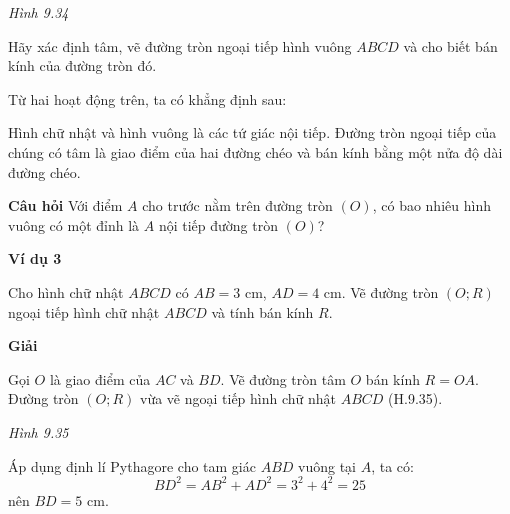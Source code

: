 \begin{lesson}
\begin{center}
        \textit{Hình 9.34}
    \end{center}

    Hãy xác định tâm, vẽ đường tròn ngoại tiếp hình vuông $ABCD$ và cho biết bán kính của đường tròn đó.

    \answerline
    \answerline

    Từ hai hoạt động trên, ta có khẳng định sau:

    \begin{keyconcept}
        Hình chữ nhật và hình vuông là các tứ giác nội tiếp. Đường tròn ngoại tiếp của chúng có tâm là giao điểm của hai đường chéo và bán kính bằng một nửa độ dài đường chéo.
    \end{keyconcept}

    \textbf{Câu hỏi} Với điểm $A$ cho trước nằm trên đường tròn $(O)$, có bao nhiêu hình vuông có một đỉnh là $A$ nội tiếp đường tròn $(O)$?

    \answerline

    \textbf{Ví dụ 3}

    Cho hình chữ nhật $ABCD$ có $AB=3$ cm, $AD=4$ cm. Vẽ đường tròn $(O;R)$ ngoại tiếp hình chữ nhật $ABCD$ và tính bán kính $R$.

    \textbf{Giải}

    Gọi $O$ là giao điểm của $AC$ và $BD$. Vẽ đường tròn tâm $O$ bán kính $R=OA$. Đường tròn $(O;R)$ vừa vẽ ngoại tiếp hình chữ nhật $ABCD$ (H.9.35).

    \begin{center}

        \textit{Hình 9.35}
    \end{center}

    Áp dụng định lí Pythagore cho tam giác $ABD$ vuông tại $A$, ta có:
    \[
        BD^2=AB^2+AD^2=3^2+4^2=25
    \]
    nên $BD=5$ cm.


\end{lesson}
